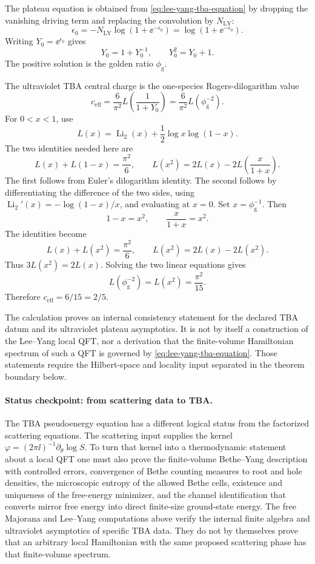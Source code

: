 The plateau equation is obtained from
\eqref{eq:lee-yang-tba-equation} by dropping the vanishing driving term and
replacing the convolution by \(N_{\mathrm{LY}}\):
\[
  \epsilon_0
  =
  -N_{\mathrm{LY}}\log(1+\ee^{-\epsilon_0})
  =
  \log(1+\ee^{-\epsilon_0}).
\]
Writing \(Y_0=\ee^{\epsilon_0}\) gives
\[
  Y_0=1+Y_0^{-1},
  \qquad
  Y_0^2=Y_0+1.
\]
The positive solution is the golden ratio \(\phi_{\mathrm g}\).

The ultraviolet TBA central charge is the one-species Rogers-dilogarithm
value
\[
  c_{\mathrm{eff}}
  =
  \frac{6}{\pi^2}
  L\!\left(\frac{1}{1+Y_0}\right)
  =
  \frac{6}{\pi^2}L(\phi_{\mathrm g}^{-2}).
\]
For \(0<x<1\), use
\[
  L(x)=\operatorname{Li}_2(x)+\frac12\log x\log(1-x).
\]
The two identities needed here are
\begin{equation}
  L(x)+L(1-x)=\frac{\pi^2}{6},
  \qquad
  L(x^2)=2L(x)-2L\!\left(\frac{x}{1+x}\right).
  \label{eq:rogers-euler-abel-identities}
\end{equation}
The first follows from Euler's dilogarithm identity.  The second follows by
differentiating the difference of the two sides, using
\(\operatorname{Li}_2'(x)=-\log(1-x)/x\), and evaluating at \(x=0\).
Set \(x=\phi_{\mathrm g}^{-1}\).  Then
\[
  1-x=x^2,\qquad
  \frac{x}{1+x}=x^2.
\]
The identities become
\[
  L(x)+L(x^2)=\frac{\pi^2}{6},
  \qquad
  L(x^2)=2L(x)-2L(x^2).
\]
Thus \(3L(x^2)=2L(x)\).  Solving the two linear equations gives
\[
  L(\phi_{\mathrm g}^{-2})=L(x^2)=\frac{\pi^2}{15}.
\]
Therefore \(c_{\mathrm{eff}}=6/15=2/5\).

\begin{remark}
The calculation proves an internal consistency statement for the declared TBA
datum and its ultraviolet plateau asymptotics.  It is not by itself a
construction of the Lee--Yang local QFT, nor a derivation that the
finite-volume Hamiltonian spectrum of such a QFT is governed by
\eqref{eq:lee-yang-tba-equation}.  Those statements require the Hilbert-space
and locality input separated in the theorem boundary below.
\end{remark}

\paragraph{Status checkpoint: from scattering data to TBA.}
The TBA pseudoenergy equation has a different logical status from the
factorized scattering equations.  The scattering input supplies the kernel
\(\varphi=(2\pi\ii)^{-1}\partial_\theta\log S\).  To turn that kernel into a
thermodynamic statement about a local QFT one must also prove the
finite-volume Bethe--Yang description with controlled errors, convergence of
Bethe counting measures to root and hole densities, the microscopic entropy
of the allowed Bethe cells, existence and uniqueness of the free-energy
minimizer, and the channel identification that converts mirror free energy
into direct finite-size ground-state energy.  The free Majorana and Lee--Yang
computations above verify the internal finite algebra and ultraviolet
asymptotics of specific TBA data.  They do not by themselves prove that an
arbitrary local Hamiltonian with the same proposed scattering phase has that
finite-volume spectrum.

